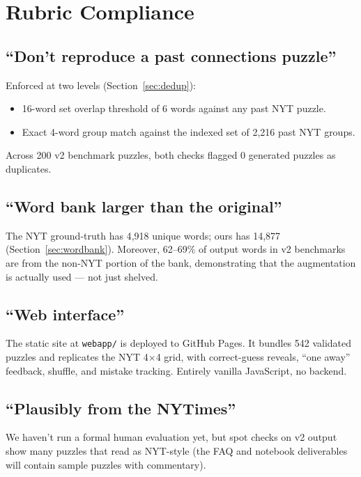 \documentclass[11pt, letterpaper]{article}
\begin{document}
\section{Rubric Compliance}

\subsection{``Don't reproduce a past connections puzzle''}
Enforced at two levels (Section~\ref{sec:dedup}):
\begin{itemize}[leftmargin=*, itemsep=0.1em]
\item 16-word set overlap threshold of 6 words against any past NYT puzzle.
\item Exact 4-word group match against the indexed set of 2{,}216 past NYT groups.
\end{itemize}
Across 200 v2 benchmark puzzles, both checks flagged 0 generated puzzles as
duplicates.

\subsection{``Word bank larger than the original''}
The NYT ground-truth has 4{,}918 unique words; ours has 14{,}877 (Section~\ref{sec:wordbank}).
Moreover, 62--69\% of output words in v2 benchmarks are from the non-NYT portion
of the bank, demonstrating that the augmentation is actually used --- not just
shelved.

\subsection{``Web interface''}
The static site at \texttt{webapp/} is deployed to GitHub Pages. It bundles 542
validated puzzles and replicates the NYT 4$\times$4 grid, with correct-guess
reveals, ``one away'' feedback, shuffle, and mistake tracking. Entirely vanilla
JavaScript, no backend.

\subsection{``Plausibly from the NYTimes''}
We haven't run a formal human evaluation yet, but spot checks on v2 output show
many puzzles that read as NYT-style (the FAQ and notebook deliverables will
contain sample puzzles with commentary).

\end{document}
